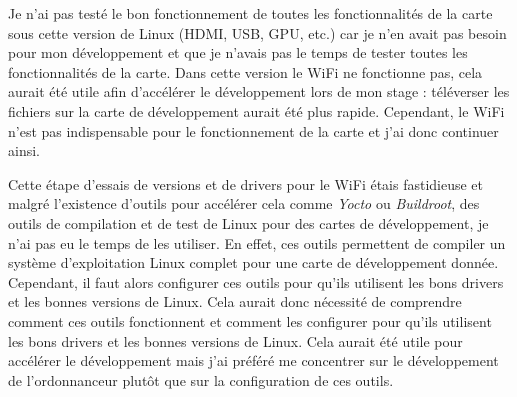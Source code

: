 Je n'ai pas testé le bon fonctionnement de toutes les fonctionnalités de la carte sous cette version de Linux (HDMI, USB, GPU, etc.) car je n'en avait pas besoin pour mon développement et que je n'avais pas le temps de tester toutes les fonctionnalités de la carte. Dans cette version le WiFi ne fonctionne pas, cela aurait été utile afin d'accélérer le développement lors de mon stage : téléverser les fichiers sur la carte de développement aurait été plus rapide. Cependant, le WiFi n'est pas indispensable pour le fonctionnement de la carte et j'ai donc continuer ainsi.

Cette étape d'essais de versions et de drivers pour le WiFi étais fastidieuse et malgré l'existence d'outils pour accélérer cela comme \textit{Yocto} ou \textit{Buildroot}, des outils de compilation et de test de Linux pour des cartes de développement, je n'ai pas eu le temps de les utiliser. En effet, ces outils permettent de compiler un système d'exploitation Linux complet pour une carte de développement donnée. Cependant, il faut alors configurer ces outils pour qu'ils utilisent les bons drivers et les bonnes versions de Linux. Cela aurait donc nécessité de comprendre comment ces outils fonctionnent et comment les configurer pour qu'ils utilisent les bons drivers et les bonnes versions de Linux. Cela aurait été utile pour accélérer le développement mais j'ai préféré me concentrer sur le développement de l'ordonnanceur plutôt que sur la configuration de ces outils.